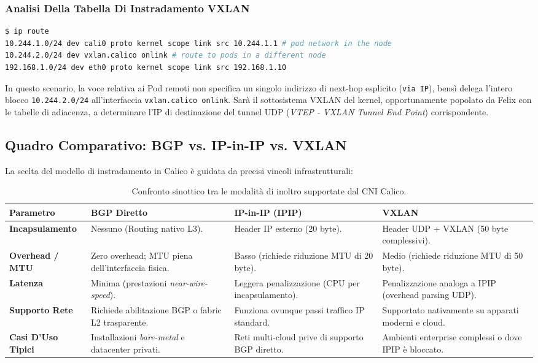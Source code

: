 \documentclass[11pt, a4paper]{article}
\begin{document}
\subsubsection{Analisi Della Tabella Di Instradamento VXLAN}
\begin{lstlisting}[language=bash]
$ ip route
10.244.1.0/24 dev cali0 proto kernel scope link src 10.244.1.1 # pod network in the node
10.244.2.0/24 dev vxlan.calico onlink # route to pods in a different node
192.168.1.0/24 dev eth0 proto kernel scope link src 192.168.1.10
\end{lstlisting}

In questo scenario, la voce relativa ai Pod remoti non specifica un singolo indirizzo di next-hop esplicito (\texttt{via IP}), bensì delega l'intero blocco \texttt{10.244.2.0/24} all'interfaccia \texttt{vxlan.calico onlink}. Sarà il sottosistema VXLAN del kernel, opportunamente popolato da Felix con le tabelle di adiacenza, a determinare l'IP di destinazione del tunnel UDP (\emph{VTEP - VXLAN Tunnel End Point}) corrispondente.

\subsection{Quadro Comparativo: BGP vs. IP-in-IP vs. VXLAN}
La scelta del modello di instradamento in Calico è guidata da precisi vincoli infrastrutturali:

\begin{table}[H]
\centering
\small
\begin{tabularx}{\textwidth}{l X X X}
\toprule
\textbf{Parametro} & \textbf{BGP Diretto} & \textbf{IP-in-IP (IPIP)} & \textbf{VXLAN} \\
\midrule
\textbf{Incapsulamento} & Nessuno (Routing nativo L3). & Header IP esterno (20 byte). & Header UDP + VXLAN (50 byte complessivi). \\
\addlinespace
\textbf{Overhead / MTU} & Zero overhead; MTU piena dell'interfaccia fisica. & Basso (richiede riduzione MTU di 20 byte). & Medio (richiede riduzione MTU di 50 byte). \\
\addlinespace
\textbf{Latenza} & Minima (prestazioni \emph{near-wire-speed}). & Leggera penalizzazione (CPU per incapsulamento). & Penalizzazione analoga a IPIP (overhead parsing UDP). \\
\addlinespace
\textbf{Supporto Rete} & Richiede abilitazione BGP o fabric L2 trasparente. & Funziona ovunque passi traffico IP standard. & Supportato nativamente su apparati moderni e cloud. \\
\addlinespace
\textbf{Casi D'Uso Tipici} & Installazioni \emph{bare-metal} e datacenter privati. & Reti multi-cloud prive di supporto BGP diretto. & Ambienti enterprise complessi o dove IPIP è bloccato. \\
\bottomrule
\end{tabularx}
\caption{Confronto sinottico tra le modalità di inoltro supportate dal CNI Calico.}
\label{tab:calico-modes}
\end{table}
\end{document}
